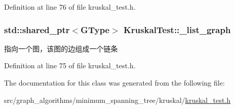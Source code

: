Definition at line 76 of file kruskal\+\_\+test.\+h.

\hypertarget{class_kruskal_test_ac63161fae446d5ec15c82562d81b0d45}{}
\subsubsection[{\+\_\+list\+\_\+graph}]{\setlength{\rightskip}{0pt plus 5cm}std\+::shared\+\_\+ptr$<${\bf G\+Type}$>$ Kruskal\+Test\+::\+\_\+list\+\_\+graph\hspace{0.3cm}{\ttfamily [protected]}}\label{class_kruskal_test_ac63161fae446d5ec15c82562d81b0d45}
指向一个图，该图的边组成一个链条 

Definition at line 75 of file kruskal\+\_\+test.\+h.



The documentation for this class was generated from the following file\+:\begin{DoxyCompactItemize}
\item 
src/graph\+\_\+algorithms/minimum\+\_\+spanning\+\_\+tree/kruskal/\hyperlink{kruskal__test_8h}{kruskal\+\_\+test.\+h}\end{DoxyCompactItemize}
